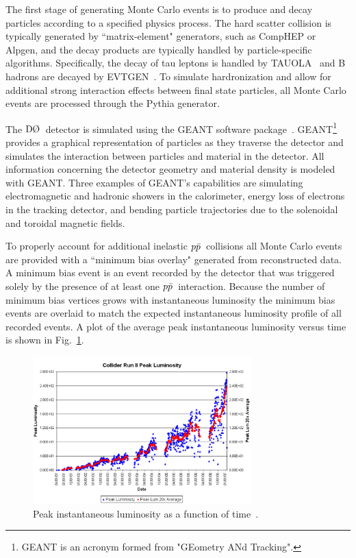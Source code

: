 The first stage of generating Monte Carlo events is to produce and decay particles according to a specified physics process. The hard scatter collision is typically generated by ``matrix-element" generators, such as CompHEP or Alpgen, and the decay products are typically handled by particle-specific algorithms. Specifically, the decay of tau leptons is handled by TAUOLA~\cite{1993CoPhC..76..361J} and B hadrons are decayed by EVTGEN~\cite{2001NIMPA.462..152L}. To simulate hardronization and allow for additional strong interaction effects between final state particles, all Monte Carlo events are processed through the Pythia generator.

The $\dzero$~detector is simulated using the GEANT software package~\cite{geant}. GEANT\footnote{GEANT is an acronym formed from "GEometry ANd Tracking".} provides a graphical representation of particles as they traverse the detector and simulates the interaction between particles and material in the detector. All information concerning the detector geometry and material density is modeled with GEANT. Three examples of GEANT's capabilities are simulating electromagnetic and hadronic showers in the calorimeter, energy loss of electrons in the tracking detector, and bending particle trajectories due to the solenoidal and toroidal magnetic fields.

To properly account for additional inelastic $\mbox{$p\bar{p}$}$~collisions all Monte Carlo events are provided with a ``minimum bias overlay" generated from reconstructed data. A minimum bias event is an event recorded by the detector that was triggered solely by the presence of at least one $\mbox{$p\bar{p}$}$~interaction. Because the number of minimum bias vertices grows with instantaneous luminosity the minimum bias events are overlaid to match the expected instantaneous luminosity profile of all recorded events. A plot of the average peak instantaneous luminosity versus time is shown in Fig.~\ref{peaklumi}.

\begin{figure}[!h!tbp]
\begin{center}
\includegraphics[width=0.75\textwidth]{eps/Reco/InstanteousLuminosity.eps}
\end{center}
\vspace{-0.1in}
\caption{Peak instantaneous luminosity as a function of time~\cite{tevlumi}.}
\label{peaklumi}
\end{figure}


